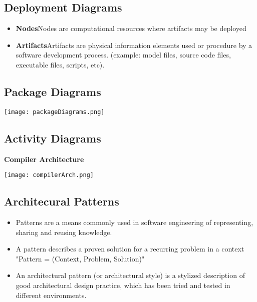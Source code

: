 \documentclass[../ESOF_notes.tex]{subfiles}
\begin{document}
\subsection{Deployment Diagrams}
\begin{itemize}
    \item \textbf{Nodes}\newline Nodes are computational resources where artifacts may be deployed
    \item \textbf{Artifacts}\newline Artifacts are physical information elements used or procedure by a software development process. (example: model files, source code files, executable files, scripts, etc).
\end{itemize}

\subsection{Package Diagrams}
\begin{center}
    \texttt{[image: packageDiagrams.png]}
\end{center}

\subsection{Activity Diagrams}
\textbf{Compiler Architecture}
\begin{center}
    \texttt{[image: compilerArch.png]}
\end{center}

\newpage

\subsection{Architecural Patterns}
\begin{itemize}
    \item Patterns are a means commonly used in software engineering of representing, sharing and reusing knowledge.
    \item A pattern describes a proven solution for a recurring problem in a context "Pattern = (Context, Problem, Solution)"
    \item An architectural pattern (or architectural style) is a stylized description of good architectural design practice, which has been tried and tested in different environments.
\end{itemize}
\end{document}
